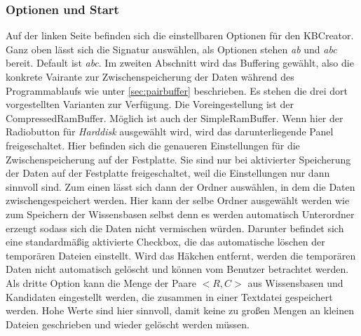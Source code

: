 \documentclass[12pt,a4paper]{article}
\begin{document}
\subsubsection{Optionen und Start}
Auf der linken Seite befinden sich die einstellbaren Optionen für den KBCreator. Ganz oben lässt sich die Signatur auswählen, als Optionen stehen \textit{ab} und \textit{abc} bereit. Default ist \textit{abc}. Im zweiten Abschnitt wird das Buffering gewählt, also die konkrete Vairante zur Zwischenspeicherung der Daten während des Programmablaufs wie unter \autoref{sec:pairbuffer} beschrieben. Es stehen die drei dort vorgestellten Varianten zur Verfügung. Die Voreingestellung ist der CompressedRamBuffer. Möglich ist auch der SimpleRamBuffer. Wenn hier der Radiobutton für \textit{Harddisk} ausgewählt wird, wird das darunterliegende Panel freigeschaltet. Hier befinden sich die genaueren Einstellungen für die Zwischenspeicherung auf der Festplatte. Sie sind nur bei aktivierter Speicherung der Daten auf der Festplatte freigeschaltet, weil die Einstellungen nur dann sinnvoll sind. Zum einen lässt sich dann der Ordner auswählen, in dem die Daten zwischengespeichert werden. Hier kann der selbe Ordner ausgewählt werden wie zum Speichern der Wissensbasen selbst denn es werden automatisch Unterordner erzeugt sodass sich die Daten nicht vermischen würden. Darunter befindet sich eine standardmäßig aktivierte Checkbox, die das automatische löschen der temporären Dateien einstellt. Wird das Häkchen entfernt, werden die temporären Daten nicht automatisch gelöscht und können vom Benutzer betrachtet werden. Als dritte Option kann die Menge der Paare $<R,C>$ aus Wissensbasen und Kandidaten eingestellt werden, die zusammen in einer Textdatei gespeichert werden. Hohe Werte sind hier sinnvoll, damit keine zu großen Mengen an kleinen Dateien geschrieben und wieder gelöscht werden müssen. \\
\end{document}

